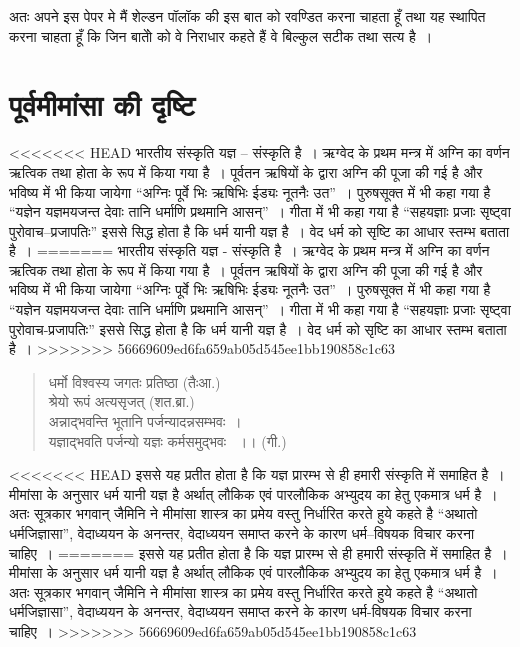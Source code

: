 अतः अपने इस पेपर मे मैं शेल्डन पॉलॉक की इस बात को रवण्डित करना चाहता हूँ तथा यह स्थापित करना चाहता हूँ कि जिन बातोें को वे निराधार कहते हैं वे बिल्कुल सटीक तथा सत्य है~।


\section*{पूर्वमीमांसा की दृष्टि}

<<<<<<< HEAD
भारतीय संस्कृति यज्ञ – संस्कृति है~। ऋग्वेद के प्रथम मन्त्र में अग्नि का वर्णन ऋत्विक तथा होता के रूप में किया गया है~। पूर्वतन ऋषियों के द्वारा अग्नि की पूजा की गई है और भविष्य में भी किया जायेगा “अग्निः पूर्वे भिः ऋषिभिः ईड्यः नूतनैः उत”~। पुरुषसूक्त में भी कहा गया है “यज्ञेन यज्ञमयजन्त देवाः तानि धर्माणि प्रथमानि आसन्”~। गीता में भी कहा गया है “सहयज्ञाः प्रजाः सृष्ट्वा पुरोवाच–प्रजापतिः” इससे सिद्ध होता है कि धर्म यानी यज्ञ है~। वेद धर्म को सृष्टि का आधार स्तम्भ बताता है~।
=======
भारतीय संस्कृति यज्ञ - संस्कृति है~। ऋग्वेद के प्रथम मन्त्र में अग्नि का वर्णन ऋत्विक तथा होता के रूप में किया गया है~। पूर्वतन ऋषियों के द्वारा अग्नि की पूजा की गई है और भविष्य में भी किया जायेगा “अग्निः पूर्वे भिः ऋषिभिः ईड्यः नूतनैः उत”~। पुरुषसूक्त में भी कहा गया है “यज्ञेन यज्ञमयजन्त देवाः तानि धर्माणि प्रथमानि आसन्”~। गीता में भी कहा गया है “सहयज्ञाः प्रजाः सृष्ट्वा पुरोवाच-प्रजापतिः” इससे सिद्ध होता है कि धर्म यानी यज्ञ है~। वेद धर्म को सृष्टि का आधार स्तम्भ बताता है~।
>>>>>>> 56669609ed6fa659ab05d545ee1bb190858c1c63

\begin{verse}
धर्मो विश्वस्य जगतः प्रतिष्ठा (तैःआ.)\\ श्रेयो रूपं अत्यसृजत् (शत.ब्रा.)\\अन्नाद्भवन्ति भूतानि पर्जन्यादन्नसम्भवः~।\\यज्ञाद्भवति पर्जन्यो यज्ञः कर्मसमुद्भवः ~।। (गी.)
\end{verse}

<<<<<<< HEAD
इससे यह प्रतीत होता है कि यज्ञ प्रारम्भ से ही हमारी संस्कृति में समाहित है~। मीमांसा के अनुसार धर्म यानी यज्ञ है अर्थात् लौकिक एवं पारलौकिक अभ्युदय का हेतु एकमात्र धर्म है~। अतः सूत्रकार भगवान् जैमिनि ने मीमांसा शास्त्र का प्रमेय वस्तु निर्धारित करते हुये कहते है “अथातो धर्मजिज्ञासा”, वेदाध्ययन के अनन्तर, वेदाध्ययन समाप्त करने के कारण धर्म–विषयक विचार करना चाहिए~।
=======
इससे यह प्रतीत होता है कि यज्ञ प्रारम्भ से ही हमारी संस्कृति में समाहित है~। मीमांसा के अनुसार धर्म यानी यज्ञ है अर्थात् लौकिक एवं पारलौकिक अभ्युदय का हेतु एकमात्र धर्म है~। अतः सूत्रकार भगवान् जैमिनि ने मीमांसा शास्त्र का प्रमेय वस्तु निर्धारित करते हुये कहते है “अथातो धर्मजिज्ञासा”, वेदाध्ययन के अनन्तर, वेदाध्ययन समाप्त करने के कारण धर्म-विषयक विचार करना चाहिए~।
>>>>>>> 56669609ed6fa659ab05d545ee1bb190858c1c63

